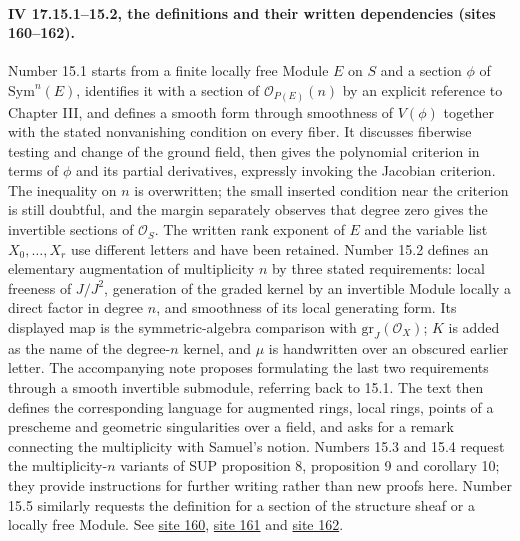 \documentclass[10pt,a4paper]{article}
\begin{document}
\paragraph{IV 17.15.1--15.2, the definitions and their written dependencies (sites 160--162).}
Number 15.1 starts from a finite locally free Module $E$ on $S$ and a section $\phi$ of $\mathrm{Sym}^n(E)$, identifies it with a section of $\mathcal O_{P(E)}(n)$ by an explicit reference to Chapter III, and defines a smooth form through smoothness of $V(\phi)$ together with the stated nonvanishing condition on every fiber. It discusses fiberwise testing and change of the ground field, then gives the polynomial criterion in terms of $\phi$ and its partial derivatives, expressly invoking the Jacobian criterion. The inequality on $n$ is overwritten; the small inserted condition near the criterion is still doubtful, and the margin separately observes that degree zero gives the invertible sections of $\mathcal O_S$. The written rank exponent of $E$ and the variable list $X_0,\ldots,X_r$ use different letters and have been retained. Number 15.2 defines an elementary augmentation of multiplicity $n$ by three stated requirements: local freeness of $J/J^2$, generation of the graded kernel by an invertible Module locally a direct factor in degree $n$, and smoothness of its local generating form. Its displayed map is the symmetric-algebra comparison with $\mathrm{gr}_J(\mathcal O_X)$; $K$ is added as the name of the degree-$n$ kernel, and $\mu$ is handwritten over an obscured earlier letter. The accompanying note proposes formulating the last two requirements through a smooth invertible submodule, referring back to 15.1. The text then defines the corresponding language for augmented rings, local rings, points of a prescheme and geometric singularities over a field, and asks for a remark connecting the multiplicity with Samuel's notion. Numbers 15.3 and 15.4 request the multiplicity-$n$ variants of SUP proposition 8, proposition 9 and corollary 10; they provide instructions for further writing rather than new proofs here. Number 15.5 similarly requests the definition for a section of the structure sheaf or a locally free Module. See \href{https://grothendieck.umontpellier.fr/web/viewer.html?file=../25.pdf#page=161}{site 160}, \href{https://grothendieck.umontpellier.fr/web/viewer.html?file=../25.pdf#page=162}{site 161} and \href{https://grothendieck.umontpellier.fr/web/viewer.html?file=../25.pdf#page=163}{site 162}.
\end{document}
